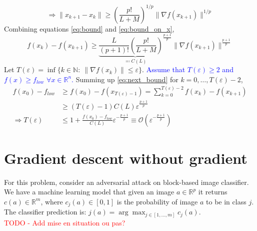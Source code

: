 \documentclass[12pt, openany]{report}
\newcommand{\R}{\mathbb{R}}
\renewcommand{\O}{\mathcal{O}}
\theoremstyle{definition}
\begin{document}
\begin{equation}\label{eq:bound_on_x}
	\Longrightarrow \lVert x_{k+1}-x_k\rVert \ge \left(\frac{p!}{L+M}\right)^{1/p}\lVert \nabla f(x_{k+1})\rVert^{1/p}
\end{equation}
Combining equations \eqref{eq:bound} and \eqref{eq:bound_on_x}, 
\begin{equation}\label{eq:next_bound}
	f(x_k)-f(x_{k+1}) \ge \underbrace{\frac{L}{(p+1)!}\left(\frac{p!}{L+M}\right)^{\frac{p+1}{p}}}_{\eqcolon C(L)} \lVert \nabla f(x_{k+1})\rVert^{\frac{p+1}{p}}
\end{equation}
Let $T(\varepsilon) = \inf \{k\in \mathbb{N}:\: \lVert \nabla f(x_k)\rVert\le \varepsilon\}$. \textcolor{blue}{Assume that $T(\varepsilon)\ge 2$ and $f(x)\ge f_{low}$ $\forall x\in \R^n$.} Summing up \eqref{eq:next_bound} for $k=0,\dots, T(\varepsilon)-2$,
\begin{equation}
	\begin{aligned}
		f(x_0)-f_{low} &\ge f(x_0)-f(x_{T(\varepsilon)-1}) = \sum_{k=0}^{T(\varepsilon)-2} f(x_k)-f(x_{k+1}) \\ 
		& \ge (T(\varepsilon)-1)C(L) \varepsilon^{\frac{p+1}{p}}\\
		\Longrightarrow T(\varepsilon) &\le 1 + \frac{f(x_0)-f_{low}}{C(L)} \varepsilon^{-\frac{p+1}{p}} \equiv \O\left(\varepsilon^{-\frac{p+1}{p}}\right)
	\end{aligned}
\end{equation}
\chapter{Gradient descent without gradient}\label{chap:}
For this problem, consider an adversarial attack on block-based image classifier. We have a machine learning model that given an image $a\in\R^p$ it returns $c(a)\in\R^m$, where $c_j(a) \in [0,1]$ is the probability of image $a$ to be in class $j$. The classifier prediction is: $j(a) = \arg\max_{j\in [1,\dots,m]} c_j(a)$.\\
\textcolor{red}{TODO - Add mise en situation ou pas?}
\newline
\end{document}
